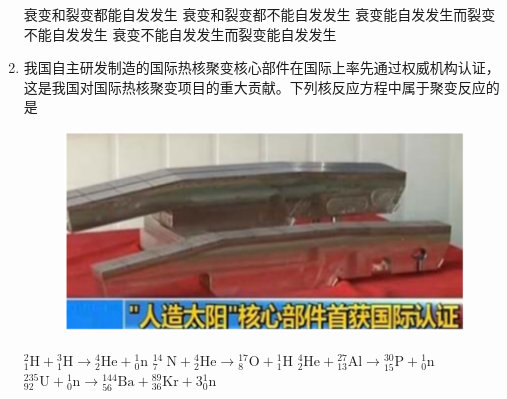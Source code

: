 \begin{enumerate}
\fourchoices
{衰变和裂变都能自发发生}
{衰变和裂变都不能自发发生}
{衰变能自发发生而裂变不能自发发生}
{衰变不能自发发生而裂变能自发发生}

\item 
{}
我国自主研发制造的国际热核聚变核心部件在国际上率先通过权威机构认证，
这是我国对国际热核聚变项目的重大贡献。下列核反应方程中属于聚变反应的是  
\begin{figure}[h!]
	\centering
	\includegraphics[width=0.27\linewidth]{picture/screenshot071}
\end{figure}


\fourchoices
{${ }_{1}^{2} \mathrm{H}+{ }_{1}^{3} \mathrm{H} \rightarrow{ }_{2}^{4} \mathrm{He}+{ }_{0}^{1} \mathrm{n}$}
{${ }_{7}^{14} \mathrm{~N}+{ }_{2}^{4} \mathrm{He} \rightarrow{ }_{8}^{17} \mathrm{O}+{ }_{1}^{1} \mathrm{H}$}
{${ }_{2}^{4} \mathrm{He}+{ }_{13}^{27} \mathrm{Al} \rightarrow{ }_{15}^{30} \mathrm{P}+{ }_{0}^{1} \mathrm{n}$}
{${ }_{92}^{235} \mathrm{U}+{ }_{0}^{1} \mathrm{n} \rightarrow{ }_{56}^{144} \mathrm{Ba}+{ }_{36}^{89} \mathrm{Kr}+3{ }_{0}^{1} \mathrm{n}$}


	
	
	
\end{enumerate}


